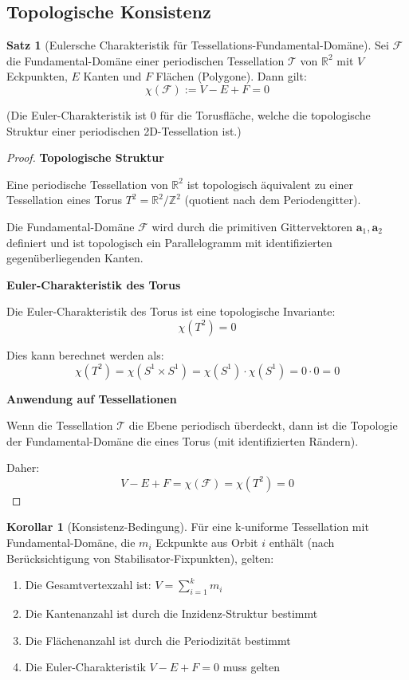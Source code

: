 \documentclass[a4paper,12pt]{article}
\theoremstyle{definition}
\newtheorem{satz}{Satz}[section]
\newtheorem{korollar}{Korollar}[section]
\begin{document}
\subsection{Topologische Konsistenz}

\begin{satz}[Eulersche Charakteristik für Tessellations-Fundamental-Domäne]
	Sei $\mathcal{F}$ die Fundamental-Domäne einer periodischen Tessellation $\mathcal{T}$ von $\mathbb{R}^2$ mit $V$ Eckpunkten, $E$ Kanten und $F$ Flächen (Polygone). Dann gilt:
	\[
	\chi(\mathcal{F}) := V - E + F = 0
	\]
	
	(Die Euler-Charakteristik ist 0 für die Torusfläche, welche die topologische Struktur einer periodischen 2D-Tessellation ist.)
\end{satz}

\begin{proof}
	\textbf{Topologische Struktur}
	
	Eine periodische Tessellation von $\mathbb{R}^2$ ist topologisch äquivalent zu einer Tessellation eines Torus $T^2 = \mathbb{R}^2 / \mathbb{Z}^2$ (quotient nach dem Periodengitter).
	
	Die Fundamental-Domäne $\mathcal{F}$ wird durch die primitiven Gittervektoren $\mathbf{a}_1, \mathbf{a}_2$ definiert und ist topologisch ein Parallelogramm mit identifizierten gegenüberliegenden Kanten.
	
	\textbf{Euler-Charakteristik des Torus}
	
	Die Euler-Charakteristik des Torus ist eine topologische Invariante:
	\[
	\chi(T^2) = 0
	\]
	
	Dies kann berechnet werden als:
	\[
	\chi(T^2) = \chi(S^1 \times S^1) = \chi(S^1) \cdot \chi(S^1) = 0 \cdot 0 = 0
	\]
	
	\textbf{Anwendung auf Tessellationen}
	
	Wenn die Tessellation $\mathcal{T}$ die Ebene periodisch überdeckt, dann ist die Topologie der Fundamental-Domäne die eines Torus (mit identifizierten Rändern).
	
	Daher:
	\[
	V - E + F = \chi(\mathcal{F}) = \chi(T^2) = 0
	\]
\end{proof}

\begin{korollar}[Konsistenz-Bedingung]
	Für eine k-uniforme Tessellation mit Fundamental-Domäne, die $m_i$ Eckpunkte aus Orbit $i$ enthält (nach Berücksichtigung von Stabilisator-Fixpunkten), gelten:
	
	\begin{enumerate}
		\item Die Gesamtvertexzahl ist: $V = \sum_{i=1}^{k} m_i$
		\item Die Kantenanzahl ist durch die Inzidenz-Struktur bestimmt
		\item Die Flächenanzahl ist durch die Periodizität bestimmt
		\item Die Euler-Charakteristik $V - E + F = 0$ muss gelten
	\end{enumerate}
\end{korollar}
\end{document}
